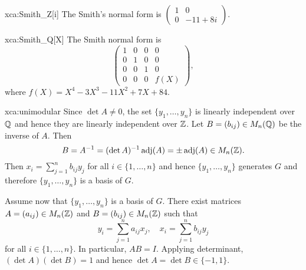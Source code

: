 \begin{sol}{xca:Smith_Z[i]}
	The Smith's normal form is $\begin{pmatrix}
		1 & 0\\
		0 & -11+8i
	\end{pmatrix}$. 
\end{sol}

\begin{sol}{xca:Smith_Q[X]}
	The Smith normal form is 
	\[
		\begin{pmatrix}
			1 & 0 & 0 & 0 \\
			0 & 1 & 0 & 0 \\
			0 & 0 & 1 & 0 \\
			0 & 0 & 0 & f(X)
		\end{pmatrix},
	\]
	where $f(X)=X^4 - 3 X^3 - 11 X^2 + 7X + 84$. 
\end{sol}

\begin{sol}{xca:unimodular}
    Since $\det A\ne 0$, the set $\{y_1,\dots,y_n\}$ is linearly independent over $\mathbb{Q}$
    and hence they are linearly independent over $\mathbb{Z}$. 
    Let $B=(b_{ij})\in M_n(\mathbb{Q})$ be the inverse of $A$. Then 
    \[
    B=A^{-1}=(\det A)^{-1}\operatorname{adj}(A)=\pm\operatorname{adj}(A)\in M_n(\mathbb{Z}).
    \]
    Then $x_i=\sum_{j=1}^n b_{ij}y_j$ for all $i\in\{1,\dots,n\}$ 
    and hence $\{y_1,\dots,y_n\}$ generates $G$ and therefore 
    $\{y_1,\dots,y_n\}$ is a basis of $G$. 
    
    Assume now that $\{y_1,\dots,y_n\}$ is a basis of $G$. There exist matrices 
    $A=(a_{ij})\in M_n(\mathbb{Z})$ and $B=(b_{ij})\in M_n(\mathbb{Z})$ such that
    \[
    y_i=\sum_{j=1}^{n}a_{ij}x_j,\quad
    x_i=\sum_{j=1}^{n}b_{ij}y_j
    \]
    for all $i\in\{1,\dots,n\}$. In particular, 
    $AB=I$. Applying determinant, $(\det A)(\det B)=1$ and hence $\det A=\det B\in\{-1,1\}$. 
\end{sol}

    
